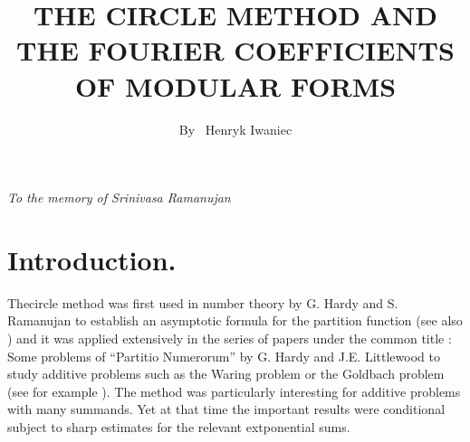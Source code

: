 
\title{THE CIRCLE METHOD AND THE FOURIER COEFFICIENTS OF MODULAR FORMS}

\author{By~ Henryk Iwaniec}

\date{}
\maketitle

\setcounter{pageoriginal}{46} 

\hfill \textit{To the memory of Srinivasa Ramanujan}

\section{Introduction.}\label{art6-sec1} The\pageoriginale circle method was first used in number theory by G. Hardy and S. Ramanujan \cite{art6-key2} to establish an asymptotic formula for the partition function (see also \cite{art6-key7}) and it was applied extensively in the series of papers under the common title : Some problems of ``Partitio Numerorum'' by G. Hardy and J.E. Littlewood to study additive problems such as the Waring problem or the Goldbach problem (see for example \cite{art6-key1}). The method was particularly interesting for additive problems with many summands. Yet at that time the important results were conditional subject to sharp estimates for the relevant extponential sums.

